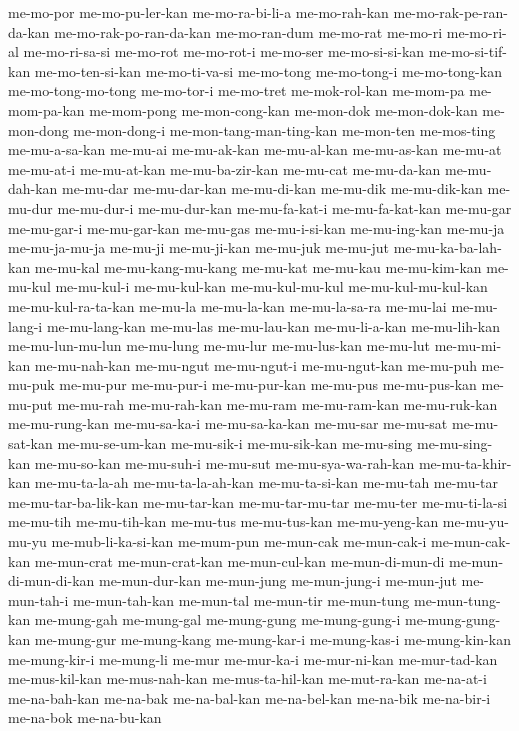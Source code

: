{me-mo-por me-mo-pu-ler-kan me-mo-ra-bi-li-a me-mo-rah-kan
me-mo-rak-pe-ran-da-kan me-mo-rak-po-ran-da-kan me-mo-ran-dum me-mo-rat
me-mo-ri me-mo-ri-al me-mo-ri-sa-si me-mo-rot me-mo-rot-i me-mo-ser
me-mo-si-si-kan me-mo-si-tif-kan me-mo-ten-si-kan me-mo-ti-va-si
me-mo-tong me-mo-tong-i me-mo-tong-kan me-mo-tong-mo-tong me-mo-tor-i
me-mo-tret me-mok-rol-kan me-mom-pa me-mom-pa-kan me-mom-pong
me-mon-cong-kan me-mon-dok me-mon-dok-kan me-mon-dong me-mon-dong-i
me-mon-tang-man-ting-kan me-mon-ten me-mos-ting me-mu-a-sa-kan me-mu-ai
me-mu-ak-kan me-mu-al-kan me-mu-as-kan me-mu-at me-mu-at-i me-mu-at-kan
me-mu-ba-zir-kan me-mu-cat me-mu-da-kan me-mu-dah-kan me-mu-dar
me-mu-dar-kan me-mu-di-kan me-mu-dik me-mu-dik-kan me-mu-dur me-mu-dur-i
me-mu-dur-kan me-mu-fa-kat-i me-mu-fa-kat-kan me-mu-gar me-mu-gar-i
me-mu-gar-kan me-mu-gas me-mu-i-si-kan me-mu-ing-kan me-mu-ja
me-mu-ja-mu-ja me-mu-ji me-mu-ji-kan me-mu-juk me-mu-jut
me-mu-ka-ba-lah-kan me-mu-kal me-mu-kang-mu-kang me-mu-kat me-mu-kau
me-mu-kim-kan me-mu-kul me-mu-kul-i me-mu-kul-kan me-mu-kul-mu-kul
me-mu-kul-mu-kul-kan me-mu-kul-ra-ta-kan me-mu-la me-mu-la-kan
me-mu-la-sa-ra me-mu-lai me-mu-lang-i me-mu-lang-kan me-mu-las
me-mu-lau-kan me-mu-li-a-kan me-mu-lih-kan me-mu-lun-mu-lun me-mu-lung
me-mu-lur me-mu-lus-kan me-mu-lut me-mu-mi-kan me-mu-nah-kan me-mu-ngut
me-mu-ngut-i me-mu-ngut-kan me-mu-puh me-mu-puk me-mu-pur me-mu-pur-i
me-mu-pur-kan me-mu-pus me-mu-pus-kan me-mu-put me-mu-rah me-mu-rah-kan
me-mu-ram me-mu-ram-kan me-mu-ruk-kan me-mu-rung-kan me-mu-sa-ka-i
me-mu-sa-ka-kan me-mu-sar me-mu-sat me-mu-sat-kan me-mu-se-um-kan
me-mu-sik-i me-mu-sik-kan me-mu-sing me-mu-sing-kan me-mu-so-kan
me-mu-suh-i me-mu-sut me-mu-sya-wa-rah-kan me-mu-ta-khir-kan
me-mu-ta-la-ah me-mu-ta-la-ah-kan me-mu-ta-si-kan me-mu-tah me-mu-tar
me-mu-tar-ba-lik-kan me-mu-tar-kan me-mu-tar-mu-tar me-mu-ter
me-mu-ti-la-si me-mu-tih me-mu-tih-kan me-mu-tus me-mu-tus-kan
me-mu-yeng-kan me-mu-yu-mu-yu me-mub-li-ka-si-kan me-mum-pun me-mun-cak
me-mun-cak-i me-mun-cak-kan me-mun-crat me-mun-crat-kan me-mun-cul-kan
me-mun-di-mun-di me-mun-di-mun-di-kan me-mun-dur-kan me-mun-jung
me-mun-jung-i me-mun-jut me-mun-tah-i me-mun-tah-kan me-mun-tal me-mun-tir
me-mun-tung me-mun-tung-kan me-mung-gah me-mung-gal me-mung-gung
me-mung-gung-i me-mung-gung-kan me-mung-gur me-mung-kang me-mung-kar-i
me-mung-kas-i me-mung-kin-kan me-mung-kir-i me-mung-li me-mur me-mur-ka-i
me-mur-ni-kan me-mur-tad-kan me-mus-kil-kan me-mus-nah-kan
me-mus-ta-hil-kan me-mut-ra-kan me-na-at-i me-na-bah-kan me-na-bak
me-na-bal-kan me-na-bel-kan me-na-bik me-na-bir-i me-na-bok me-na-bu-kan
}
